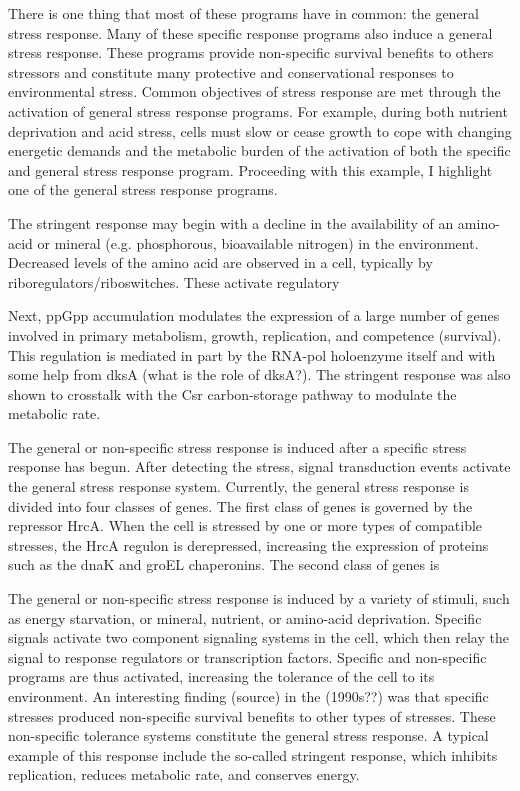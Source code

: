 There is one thing that most of these programs have in common: the general stress response. Many of these specific response programs also induce a general stress response. These programs provide non-specific survival benefits to others stressors and constitute many protective and conservational responses to environmental stress. Common objectives of stress response are met through the activation of general stress response programs. For example, during both nutrient deprivation and acid stress, cells must slow or cease growth to cope with changing energetic demands and the metabolic burden of the activation of both the specific and general stress response program. Proceeding with this example, I highlight one of the general stress response programs.

The stringent response may begin with a decline in the availability of an amino-acid or mineral (e.g. phosphorous, bioavailable nitrogen) in the environment. Decreased levels of the amino acid are observed in a cell, typically by riboregulators/riboswitches. These activate regulatory

Next, ppGpp accumulation modulates the expression of a large number of genes involved in primary metabolism, growth, replication, and competence (survival). This regulation is mediated in part by the RNA-pol holoenzyme itself and with some help from dksA (what is the role of dksA?). The stringent response was also shown to crosstalk with the Csr carbon-storage pathway to modulate the metabolic rate.




The general or non-specific stress response is induced after a specific stress response has begun. After detecting the stress, signal transduction events activate the general stress response system. Currently, the general stress response is divided into four classes of genes. The first class of genes is governed by the repressor HrcA. When the cell is stressed by one or more types of compatible stresses, the HrcA regulon is derepressed, increasing the expression of proteins such as the dnaK and groEL chaperonins. The second class of genes is 



The general or non-specific stress response is induced by a variety of stimuli, such as energy starvation, or mineral, nutrient, or amino-acid deprivation. Specific signals activate two component signaling systems in the cell, which then relay the signal to response regulators or transcription factors. Specific and non-specific programs are thus activated, increasing the tolerance of the cell to its environment. An interesting finding (source) in the (1990s??) was that specific stresses produced non-specific survival benefits to other types of stresses. These non-specific tolerance systems constitute the general stress response. A typical example of this response include the so-called stringent response, which inhibits replication, reduces metabolic rate, and conserves energy.

